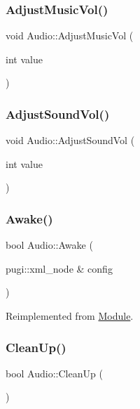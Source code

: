 \subsubsection{\texorpdfstring{AdjustMusicVol()}{AdjustMusicVol()}}
{\footnotesize\ttfamily void Audio\+::\+Adjust\+Music\+Vol (\begin{DoxyParamCaption}\item[{int}]{value }\end{DoxyParamCaption})}

\mbox{\label{class_audio_a195c13bc06fa77dbd54bda907ff6627f}} 
\subsubsection{\texorpdfstring{AdjustSoundVol()}{AdjustSoundVol()}}
{\footnotesize\ttfamily void Audio\+::\+Adjust\+Sound\+Vol (\begin{DoxyParamCaption}\item[{int}]{value }\end{DoxyParamCaption})}

\mbox{\label{class_audio_a642fa346ae3e6658ad8c6b06c1da1f19}} 
\subsubsection{\texorpdfstring{Awake()}{Awake()}}
{\footnotesize\ttfamily bool Audio\+::\+Awake (\begin{DoxyParamCaption}\item[{pugi\+::xml\+\_\+node \&}]{config }\end{DoxyParamCaption})\hspace{0.3cm}{\ttfamily [virtual]}}



Reimplemented from \mbox{\hyperlink{class_module_a4a283650cf8a73aa0b5599106bc2ba6c}{Module}}.

\mbox{\label{class_audio_a15ae1aa195c9c5f754850e5884bd2dc9}} 
\subsubsection{\texorpdfstring{CleanUp()}{CleanUp()}}
{\footnotesize\ttfamily bool Audio\+::\+Clean\+Up (\begin{DoxyParamCaption}{ }\end{DoxyParamCaption})\hspace{0.3cm}{\ttfamily [virtual]}}



